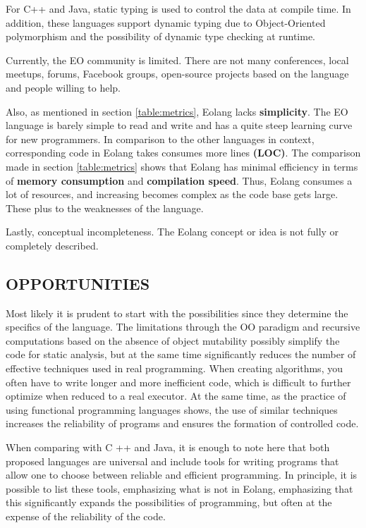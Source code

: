 \documentclass[12pt]{book}
\begin{document}
For C++ and Java, static typing is used to control the data at compile time. In addition, these languages support dynamic typing due to Object-Oriented polymorphism and the possibility of dynamic type checking at runtime.

Currently, the EO community is limited. There are not many conferences, local meetups, forums, Facebook groups, open-source projects based on the language and people willing to help. 

Also, as mentioned in section \ref{table:metrics}, Eolang lacks \textbf{simplicity}. The EO language is barely simple to read and write and has a quite steep learning curve for new programmers. In comparison to the other languages in context, corresponding code in Eolang takes consumes more lines \textbf{(LOC)}. The comparison made in section \ref{table:metrics} shows that Eolang has minimal efficiency in terms of \textbf{memory consumption} and \textbf{compilation speed}. Thus, Eolang consumes a lot of resources, and increasing becomes complex as the code base gets large. These plus to the weaknesses of the language.

Lastly, conceptual incompleteness. The Eolang concept or idea is not fully or completely described.

\subsection{OPPORTUNITIES}
Most likely it is prudent to start with the possibilities since they determine the specifics of the language. The limitations through the OO paradigm and recursive computations based on the absence of object mutability possibly simplify the code for static analysis, but at the same time significantly reduces the number of effective techniques used in real programming. When creating algorithms, you often have to write longer and more inefficient code, which is difficult to further optimize when reduced to a real executor. At the same time, as the practice of using functional programming languages shows, the use of similar techniques increases the reliability of programs and ensures the formation of controlled code.

When comparing with C ++ and Java, it is enough to note here that both proposed languages are universal and include tools for writing programs that allow one to choose between reliable and efficient programming. In principle, it is possible to list these tools, emphasizing what is not in Eolang, emphasizing that this significantly expands the possibilities of programming, but often at the expense of the reliability of the code.
\end{document}
